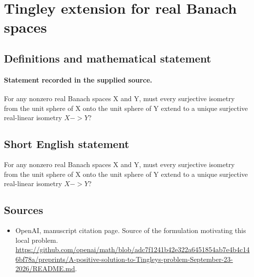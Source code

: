 \documentclass[11pt]{article}
\begin{document}
\section*{Tingley extension for real Banach spaces}\label{30007187}
\subsection{Definitions and mathematical statement}
\paragraph{Statement recorded in the supplied source.}
For any nonzero real Banach spaces X and Y, must every surjective isometry from the unit sphere of X onto the unit sphere of Y extend to a unique surjective real-linear isometry $X->Y$?
\subsection{Short English statement}
For any nonzero real Banach spaces X and Y, must every surjective isometry from the unit sphere of X onto the unit sphere of Y extend to a unique surjective real-linear isometry $X->Y$?
\subsection{Sources}
\begin{itemize}
\item[S1] OpenAI, manuscript citation page. Source of the formulation motivating this local problem.
\url{https://github.com/openai/math/blob/adc7f1241b42e322a6451854ab7e4b4c146bf78a/preprints/A-positive-solution-to-Tingleys-problem-September-23-2026/README.md}.
\end{itemize}
\end{document}

